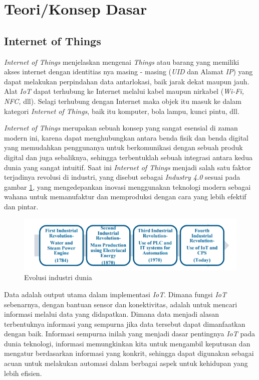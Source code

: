 \section{Teori/Konsep Dasar}

\subsection{Internet of Things}

\textit{Internet of Things} menjelaskan mengenai \textit{Things} atau barang yang memiliki akses internet dengan identitias nya masing - masing (\textit{UID} dan Alamat \textit{IP}) yang dapat melakukan perpindahan data antarlokasi, baik jarak dekat maupun jauh. Alat \textit{IoT} dapat terhubung ke Internet melalui kabel maupun nirkabel (\textit{Wi-Fi, NFC,} dll). Selagi terhubung dengan Internet maka objek itu masuk ke dalam kategori \textit{Internet of Things}, baik itu komputer, bola lampu, kunci pintu, dll. 

\textit{Internet of Things} merupakan sebuah konsep yang sangat esensial di zaman modern ini, karena dapat menghubungkan antara benda fisik dan benda digital yang memudahkan penggunanya untuk berkomunikasi dengan sebuah produk digital dan juga sebaliknya, sehingga terbentuklah sebuah integrasi antara kedua dunia yang sangat intuitif. Saat ini \textit{Internet of Things} menjadi salah satu faktor terjadinya revolusi di industri, yang disebut sebagai \textit{Industry 4.0} sesuai pada gambar \ref{fig:industry40}, yang mengedepankan inovasi menggunakan teknologi modern sebagai wahana untuk memanufaktur dan memproduksi dengan cara yang lebih efektif dan pintar. 

\begin{figure}[H]
    \centering
    \includegraphics[width=0.8\linewidth]{gambar/industry-40.png}
    \caption{Evolusi industri dunia \cite{industry40}}
    \label{fig:industry40}
\end{figure}

Data adalah output utama dalam implementasi \textit{IoT}. Dimana fungsi \textit{IoT} sebenarnya, dengan bantuan sensor dan konektivitas, adalah untuk mencari informasi melalui data yang didapatkan. Dimana data menjadi alasan terbentuknya informasi yang sempurna jika data tersebut dapat dimanfaatkan dengan baik. Informasi sempurna inilah yang menjadi dasar pentingnya \textit{IoT} pada dunia teknologi, informasi memungkinkan kita untuk mengambil keputusan dan mengatur berdasarkan informasi yang konkrit, sehingga dapat digunakan sebagai acuan untuk melakukan automasi dalam berbagai aspek untuk kehidupan yang lebih efisien. \parencite{iot-sg}

